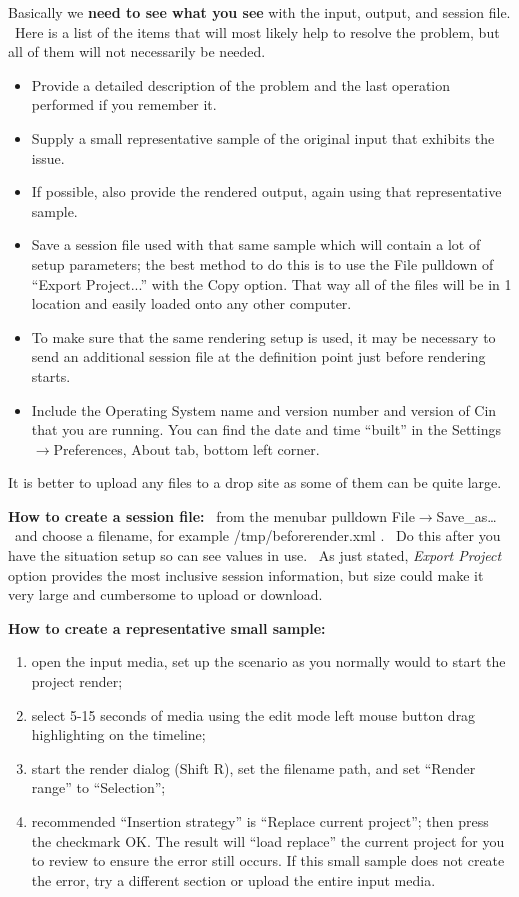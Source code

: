 Basically we\textbf{ need to see what you see }with the input, output, and session file. \ Here is a list of the items that will most likely help to resolve the problem, but all of them will not necessarily be needed.
\medskip

\begin{itemize}[nosep]
	\item Provide a detailed description of the problem and the last operation performed if you remember it.
	\item Supply a small representative sample of the original input that exhibits the issue.
	\item If possible, also provide the rendered output, again using that representative sample.
	\item Save a session file used with that same sample which will contain a lot of setup parameters; the best method to do this is to use the File pulldown of ``Export Project...'' with the Copy option. That way all of the files will be in 1 location and easily loaded onto any other computer.
	\item To make sure that the same rendering setup is used, it may be necessary to send an additional session file at the definition point just before rendering starts.
	\item Include the Operating System name and version number and version of Cin that you are running. You can find the date and time ``built'' in the Settings$\rightarrow$Preferences, About tab, bottom left corner.
\end{itemize} 
\medskip

It is better to upload any files to a drop site as some of them can be quite large.
\medskip

\textbf{How to create a session file:} \ from the menubar pulldown File$\rightarrow $Save\_as{\dots} \ and choose a
filename, for example /tmp/beforerender.xml . \ Do this after you have the situation setup so can see values in use.
\ As just stated, \textit{Export Project} option provides the most inclusive session information, but size could make
it very large and cumbersome to upload or download.
\medskip

\textbf{How to create a representative small sample:} 
\begin{enumerate}[nosep]
	\item open the input media, set up the scenario as you normally would to start the project render;
	\item select 5-15 seconds of media using the edit mode left mouse button drag highlighting on the timeline;
	\item start the render dialog (Shift R), set the filename path, and set ``Render range'' to ``Selection'';
	\item recommended ``Insertion strategy'' is ``Replace current project''; then press the checkmark OK. The result will ``load replace'' the current project for you to review to ensure the error still occurs. If this small sample does not create the error, try a different section or upload the entire input media.
\end{enumerate}


